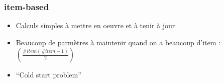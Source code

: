 \begin{frame}
  \frametitle{item-based}
  \begin{itemize}[<+->]
  \item Calculs simples à mettre en oeuvre et à tenir à jour \\
  \item Beaucoup de parmètres à maintenir quand on a beaucoup d'item : $\left(\frac{\#item(\#item-1)}{2}\right)$
  \item ``Cold start problem''
  \end{itemize}
\end{frame}


